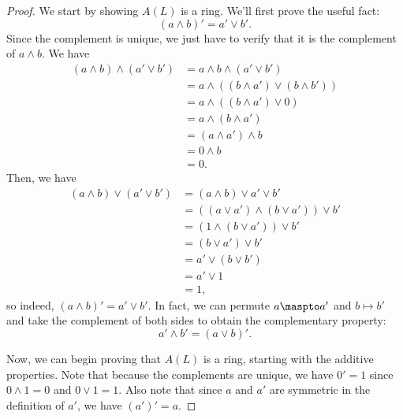 \begin{proof}
We start by showing $A(L)$ is a ring. We'll first prove the useful fact:
$$(a \wedge b)' = a' \vee b'.$$
Since the complement is unique, we just have to verify that it is the complement of $a \wedge b$. We have
\begin{align*}
(a \wedge b) \wedge (a' \vee b') &= a \wedge b \wedge (a' \vee b')\\
&= a \wedge ((b \wedge a') \vee (b \wedge b'))\\
&= a \wedge ((b \wedge a') \vee 0)\\
&= a \wedge (b \wedge a')\\
&= (a \wedge a') \wedge b \\
&= 0 \wedge b \\
&= 0.
\end{align*}
Then, we have
\begin{align*}
(a \wedge b) \vee (a' \vee b') &= (a \wedge b) \vee a' \vee b'\\
&= ((a \vee a') \wedge (b \vee a')) \vee b'\\
&= (1 \wedge (b \vee a')) \vee b'\\
&= (b \vee a') \vee b'\\
&= a' \vee (b \vee b')\\
&= a' \vee 1\\
&= 1,
\end{align*}
so indeed, $(a \wedge b)' = a' \vee b'$. In fact, we can permute $a \maspto a'$ and $b \mapsto b'$ and take the complement of both sides to obtain the complementary property:
$$a' \wedge b' = (a \vee b)'.$$

Now, we can begin proving that $A(L)$ is a ring, starting with the additive properties. Note that because the complements are unique, we have $0' = 1$ since $0 \wedge 1 = 0$ and $0 \vee 1 = 1$. Also note that
since $a$ and $a'$ are symmetric in the definition of $a'$, we have $(a')' = a$.


\end{proof}
